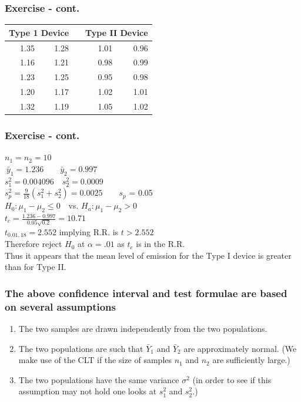 \documentclass[xcolor=dvipsnames,12pt]{beamer}
\begin{document}
\begin{frame}
\frametitle{Exercise - cont.}
\begin{center}
\begin{tabular}{rrrrr} \hline
\multicolumn{2}{c}{\textbf{Type 1 Device}} & & 
\multicolumn{2}{c}{\textbf{Type II Device}} \\ \hline
1.35 & 1.28 & & 1.01 & 0.96 \\
1.16 & 1.21 & & 0.98 & 0.99 \\
1.23 & 1.25 & & 0.95 & 0.98 \\
1.20 & 1.17 & & 1.02 & 1.01 \\
1.32 & 1.19 & & 1.05 & 1.02 \\ \hline
\end{tabular}
\end{center}
\end{frame}

\begin{frame}
\frametitle{Exercise - cont.}
\hspace*{2in}$n_1 = n_2 = 10 $\\[.1in]
\hspace*{1.4in}$\ \bar{y}_1 = 1.236 \quad \quad   \bar{y}_2 = 0.997$ \\[.1in]
\hspace*{1.5in}$s_1^2 = 0.004096 \quad s_2^2 = 0.0009$ \\[.1in]
\hspace*{1.2in}$s_p^2 = \frac{9}{18} (s_1^2 + s_2^2) = 0.0025 \quad \quad s_p$ = 0.05 \\[.1in]
\hspace*{.8in}$H_0: \mu_1 - \mu_2 \leq 0$\ \ vs. $H_a: \mu_1 - \mu_2 > 0 $\\[.15in]
\hspace*{1.5in}$t_c = \frac{1.236-0.997}{0.05\sqrt{0.2}} = 10.71$ \\[.15in]
\hspace*{1.2in}$t_{0.01,18} = 2.552$ implying R.R. is $t>2.552$\\[.1in]
Therefore reject $H_0$ at $\alpha=.01$ as  $t_c$ is in the R.R.\\[.1in]
Thus it appears that the mean level of emission for the Type I
device is greater than for Type II.
\end{frame}



\begin{frame}
\frametitle{The above confidence interval and test formulae are based on several assumptions}
\begin{enumerate}
\item The two samples are drawn independently from the two
      populations.
\item The two populations are such that $\bar{Y}_1$ and
      $\bar{Y}_2$ are approximately normal.  (We make use of
      the CLT if the size of samples $n_1$ and $n_2$ are 
      sufficiently large.)
\item The two populations have the same variance $\sigma^2$
      (in order to see if this assumption may not hold one
      looks at $s_1^2$ and $s_2^2$.)
\end{enumerate}
\end{frame}
\end{document}

